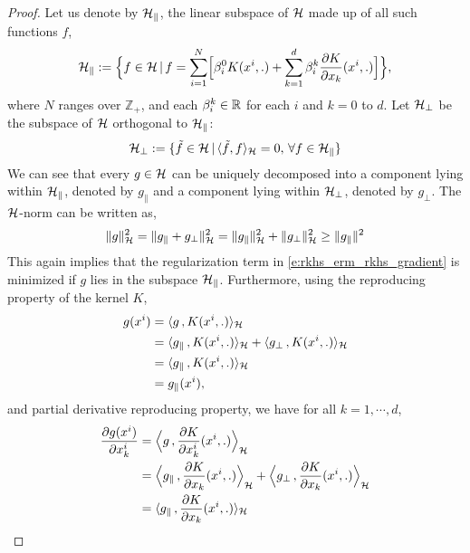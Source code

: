 \begin{proof}
Let us denote by ${\cal H}_\parallel$, the linear subspace of ${\cal H}$ made up of all such functions $f$,
	\[
	{\cal H}_\parallel := \Bigl\{f \in {\cal H}\, |\, f = \sum_{i=1}^N \Bigl[ \beta^0_i K(x^i,.) + \sum_{k=1}^d \beta_i^k \frac{\partial K }{\partial x_k} (x^i, .)\Bigr]\Bigr\},
	\]
	where $N$ ranges over $\mathbb{Z}_+$, and  each $\beta_i^k \in \mathbb{R}$ for each $i$ and $k = 0$ to $d$. Let ${\cal H}_{\perp}$ be the subspace of ${\cal H}$ orthogonal to ${\cal H}_\parallel$:
	\[
	{\cal H}_\perp : = \{ \tilde f \in {\cal H}\,| \, \langle \tilde f , f \rangle_{\cal H} = 0 ,\, \forall f \in {\cal H}_\parallel \}
	\]
	We can see that every $g \in {\cal H}$ can be uniquely decomposed into a component lying within ${\cal H}_\parallel$, denoted by $g_\parallel$ and a component lying within ${\cal H}_\perp$, denoted by $g_\perp$.
	The ${\cal H}$-norm can be written as,
	\begin{equation}
	\|g\|^2_\clH = \|g_\parallel + g_\perp\|^2_\clH = \|g_\parallel\|^2_\clH + \|g_\perp\|^2_\clH \geq \|g_\parallel\|^2
	\label{e:rkhs_g_reg}
	\end{equation}
	This again implies that the regularization term in \eqref{e:rkhs_erm_rkhs_gradient} is minimized if $g$ lies in the subspace ${\cal H}_\parallel$. Furthermore, using the reproducing property of the kernel $K$,
	\begin{equation}
	\begin{aligned}
	g(x^i) & =  \langle g \, , K(x^i,.) \rangle_\clH\\
	&  = \langle g_\parallel\, , K(x^i,.) \rangle_\clH + \langle g_\perp \, , K(x^i,.) \rangle_\clH \\
	&  = \langle g_\parallel\, , K(x^i,.) \rangle_\clH \\
	&  = g_\parallel(x^i),
	\end{aligned}
	\label{e:rkhs_g_parallel}
	\end{equation}
	and partial derivative reproducing property, we have for all $k = 1, \cdots, d$,
	\begin{equation}
	\begin{aligned}
	\frac{\partial g(x^i)}{\partial x^i_k} & = \Bigl \langle g \, , \frac{\partial K}{\partial x^i_k} (x^i,.) \Bigr \rangle_\clH\\
	&  = \Bigl \langle g_\parallel\, , \frac{\partial K}{\partial x_k} (x^i,.)  \Bigr \rangle_\clH + \Bigl \langle g_\perp \, ,\frac{\partial K}{\partial x_k} (x^i,.) \Bigr \rangle_\clH \\
	&  = \langle g_\parallel\, , \frac{\partial K}{\partial x_k} (x^i,.) \rangle_\clH \\

\end{aligned}
\end{equation}
\end{proof}
